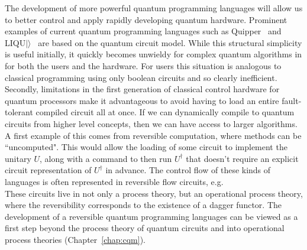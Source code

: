 The development of more powerful quantum programming languages will allow us to better control and apply rapidly developing quantum hardware. Prominent examples of current quantum programming languages such as Quipper~\cite{green2013quipper} and LIQU$|\rangle$~\cite{wecker2014liqui} are based on the quantum circuit model. While this structural simplicity is useful initially, it quickly becomes unwieldy for complex quantum algorithms in for both the users and the hardware. For users this situation is analogous to classical programming using only boolean circuits and so clearly inefficient. Secondly, limitations in the first generation of classical control hardware for quantum processors make it advantageous to avoid having to load an entire fault-tolerant compiled circuit all at once. If we can dynamically compile to quantum circuits from higher level concepts, then we can have access to larger algorithms. A first example of this comes from reversible computation, where methods can be ``uncomputed". This would allow the loading of some circuit to implement the unitary $U$, along with a command to then run $U^{\dagger}$ that doesn't require an explicit circuit representation of $U^{\dagger}$ in advance. The control flow of these kinds of languages is often represented in reversible flow circuits, e.g.
\begin{equation}
\end{equation}
These circuits live in not only a process theory, but an operational process theory, where the reversibility corresponds to the existence of a dagger functor. The development of a reversible quantum programming languages can be viewed as a first step beyond the process theory of quantum circuits and into operational process theories (Chapter~\ref{chap:cqm}).

